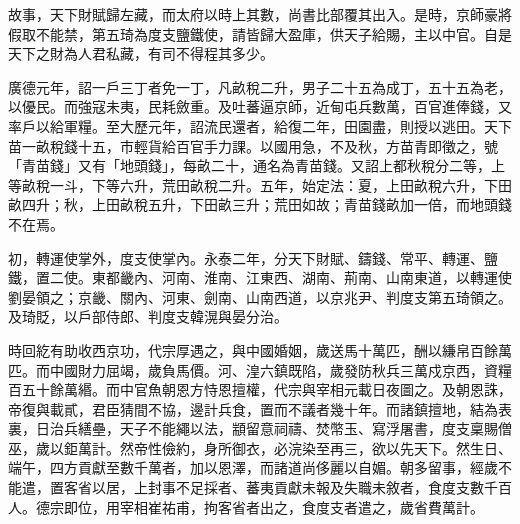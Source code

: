 \begin{pinyinscope}
 故事，天下財賦歸左藏，而太府以時上其數，尚書比部覆其出入。是時，京師豪將假取不能禁，第五琦為度支鹽鐵使，請皆歸大盈庫，供天子給賜，主以中官。自是天下之財為人君私藏，有司不得程其多少。



 廣德元年，詔一戶三丁者免一丁，凡畝稅二升，男子二十五為成丁，五十五為老，以優民。而強寇未夷，民耗斂重。及吐蕃逼京師，近甸屯兵數萬，百官進俸錢，又率戶以給軍糧。至大歷元年，詔流民還者，給復二年，田園盡，則授以逃田。天下苗一畝稅錢十五，市輕貨給百官手力課。以國用急，不及秋，方苗青即徵之，號「青苗錢」又有「地頭錢」，每畝二十，通名為青苗錢。又詔上都秋稅分二等，上等畝稅一斗，下等六升，荒田畝稅二升。五年，始定法：夏，上田畝稅六升，下田畝四升；秋，上田畝稅五升，下田畝三升；荒田如故；青苗錢畝加一倍，而地頭錢不在焉。



 初，轉運使掌外，度支使掌內。永泰二年，分天下財賦、鑄錢、常平、轉運、鹽鐵，置二使。東都畿內、河南、淮南、江東西、湖南、荊南、山南東道，以轉運使劉晏領之；京畿、關內、河東、劍南、山南西道，以京兆尹、判度支第五琦領之。及琦貶，以戶部侍郎、判度支韓滉與晏分治。



 時回紇有助收西京功，代宗厚遇之，與中國婚姻，歲送馬十萬匹，酬以縑帛百餘萬匹。而中國財力屈竭，歲負馬價。河、湟六鎮既陷，歲發防秋兵三萬戍京西，資糧百五十餘萬緡。而中官魚朝恩方恃恩擅權，代宗與宰相元載日夜圖之。及朝恩誅，帝復與載貳，君臣猜間不協，邊計兵食，置而不議者幾十年。而諸鎮擅地，結為表裏，日治兵繕壘，天子不能繩以法，顓留意祠禱、焚幣玉、寫浮屠書，度支稟賜僧巫，歲以鉅萬計。然帝性儉約，身所御衣，必浣染至再三，欲以先天下。然生日、端午，四方貢獻至數千萬者，加以恩澤，而諸道尚侈麗以自媚。朝多留事，經歲不能遣，置客省以居，上封事不足採者、蕃夷貢獻未報及失職未敘者，食度支數千百人。德宗即位，用宰相崔祐甫，拘客省者出之，食度支者遣之，歲省費萬計。



\end{pinyinscope}